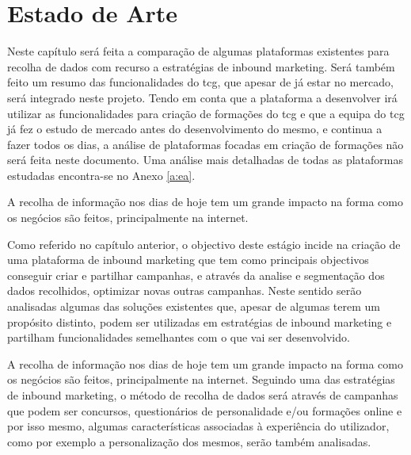 \chapter{Estado de Arte}
\label{sec:estado-arte}

Neste capítulo será feita a comparação de algumas plataformas existentes para recolha de dados com recurso a estratégias de inbound marketing. Será também feito um resumo das funcionalidades do \acrshort{tcg}, que apesar de já estar no mercado, será integrado neste projeto. Tendo em conta que a plataforma a desenvolver irá utilizar as funcionalidades para criação de formações do \acrshort{tcg} e que a equipa do \acrlong{tcg} já fez o estudo de mercado antes do desenvolvimento do mesmo, e continua a fazer todos os dias, a análise de plataformas focadas em criação de formações não será feita neste documento. Uma análise mais detalhadas de todas as plataformas estudadas encontra-se no Anexo \ref{a:ea}.

A recolha de informação nos dias de hoje tem um grande impacto na forma como os negócios são feitos, principalmente na internet.

Como referido no capítulo anterior, o objectivo deste estágio incide na criação de uma plataforma de inbound marketing que tem como principais objectivos conseguir criar e partilhar campanhas, e através da analise e segmentação dos dados recolhidos, optimizar novas outras campanhas. Neste sentido serão analisadas algumas das soluções existentes que, apesar de algumas terem um propósito distinto, podem ser utilizadas em estratégias de inbound marketing e partilham funcionalidades semelhantes com o que vai ser desenvolvido. 

A recolha de informação nos dias de hoje tem um grande impacto na forma como os negócios são feitos, principalmente na internet. Seguindo uma das estratégias de inbound marketing, o método de recolha de dados será através de campanhas que podem ser concursos, questionários de personalidade e/ou formações online e por isso mesmo, algumas características associadas à experiência do utilizador, como por exemplo a personalização dos mesmos, serão também analisadas.


